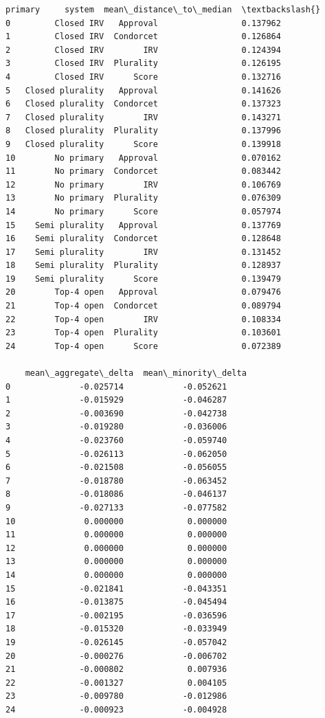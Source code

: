 \documentclass[11pt]{article}
\makeatletter
\newcommand{\boxspacing}{\kern\kvtcb@left@rule\kern\kvtcb@boxsep}
\newcommand{\prompt}[4]{
        {\ttfamily\llap{{\color{#2}[#3]:\hspace{3pt}#4}}\vspace{-\baselineskip}}
    }
\makeatother
\begin{document}
            \begin{tcolorbox}[breakable, size=fbox, boxrule=.5pt, pad at break*=1mm, opacityfill=0]
\prompt{Out}{outcolor}{31}{\boxspacing}
\begin{Verbatim}[commandchars=\\\{\}]
             primary     system  mean\_distance\_to\_median  \textbackslash{}
0         Closed IRV   Approval                 0.137962
1         Closed IRV  Condorcet                 0.126864
2         Closed IRV        IRV                 0.124394
3         Closed IRV  Plurality                 0.126195
4         Closed IRV      Score                 0.132716
5   Closed plurality   Approval                 0.141626
6   Closed plurality  Condorcet                 0.137323
7   Closed plurality        IRV                 0.143271
8   Closed plurality  Plurality                 0.137996
9   Closed plurality      Score                 0.139918
10        No primary   Approval                 0.070162
11        No primary  Condorcet                 0.083442
12        No primary        IRV                 0.106769
13        No primary  Plurality                 0.076309
14        No primary      Score                 0.057974
15    Semi plurality   Approval                 0.137769
16    Semi plurality  Condorcet                 0.128648
17    Semi plurality        IRV                 0.131452
18    Semi plurality  Plurality                 0.128937
19    Semi plurality      Score                 0.139479
20        Top-4 open   Approval                 0.079476
21        Top-4 open  Condorcet                 0.089794
22        Top-4 open        IRV                 0.108334
23        Top-4 open  Plurality                 0.103601
24        Top-4 open      Score                 0.072389

    mean\_aggregate\_delta  mean\_minority\_delta
0              -0.025714            -0.052621
1              -0.015929            -0.046287
2              -0.003690            -0.042738
3              -0.019280            -0.036006
4              -0.023760            -0.059740
5              -0.026113            -0.062050
6              -0.021508            -0.056055
7              -0.018780            -0.063452
8              -0.018086            -0.046137
9              -0.027133            -0.077582
10              0.000000             0.000000
11              0.000000             0.000000
12              0.000000             0.000000
13              0.000000             0.000000
14              0.000000             0.000000
15             -0.021841            -0.043351
16             -0.013875            -0.045494
17             -0.002195            -0.036596
18             -0.015320            -0.033949
19             -0.026145            -0.057042
20             -0.000276            -0.006702
21             -0.000802             0.007936
22             -0.001327             0.004105
23             -0.009780            -0.012986
24             -0.000923            -0.004928
\end{Verbatim}
\end{tcolorbox}
        
\end{document}
